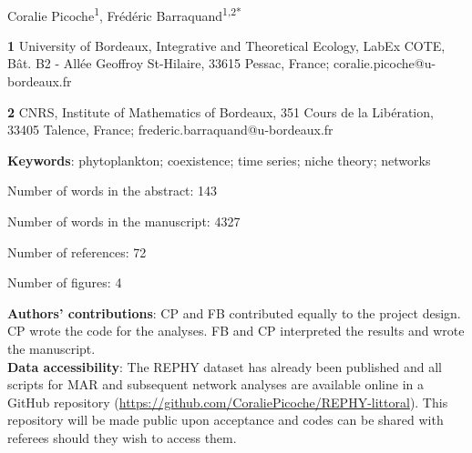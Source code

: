 \documentclass[10pt]{article}
\begin{document}
\vspace*{0.2in}


{\Large
\textbf{} %
}
\newline
\bigskip
{\large
\textbf{} %
}
\newline
\\
\bigskip
Coralie Picoche\textsuperscript{1},
Frédéric Barraquand\textsuperscript{1,2*}
\\
\bigskip

\textbf{1} University of Bordeaux, Integrative and Theoretical Ecology, LabEx COTE, Bât. B2 - Allée Geoffroy St-Hilaire, 33615 Pessac, France; coralie.picoche@u-bordeaux.fr


\textbf{2} CNRS, Institute of Mathematics of Bordeaux, 351 Cours de la Libération, 33405 Talence, France; frederic.barraquand@u-bordeaux.fr
\\

\bigskip

\textbf{Keywords}: phytoplankton; coexistence; time series; niche theory; networks 

\bigskip
Number of words in the abstract: 143

Number of words in the manuscript: 4327

Number of references: 72

Number of figures: 4
\bigskip

\textbf{Authors' contributions}: CP and FB contributed equally to the project design. CP wrote the code for the analyses. FB and CP interpreted the results and wrote the manuscript.\\

\textbf{Data accessibility}: The REPHY dataset has already been published \citep{REPHY_db} and all scripts for MAR and subsequent network analyses are available online in a GitHub repository (\url{https://github.com/CoraliePicoche/REPHY-littoral}). This repository will be made public upon acceptance and codes can be shared with referees should they wish to access them.
\end{document}
